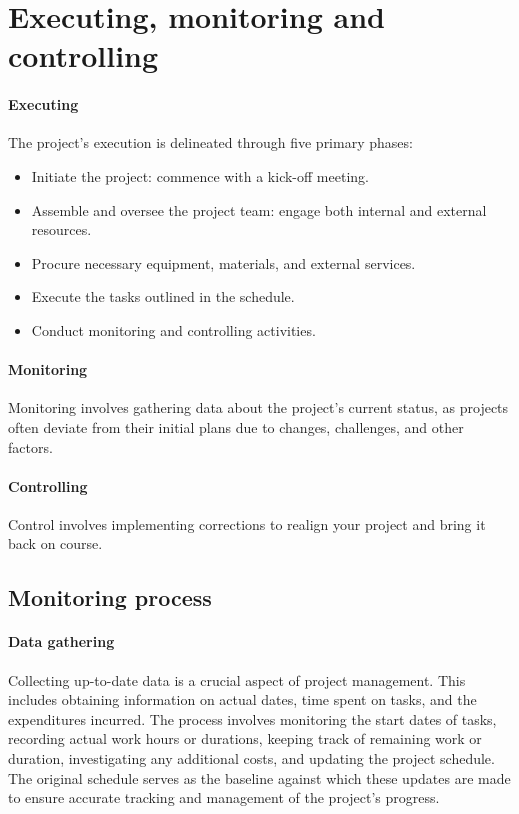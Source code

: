 \section{Executing, monitoring and controlling}

\paragraph*{Executing}
The project's execution is delineated through five primary phases:
\begin{itemize}
\item Initiate the project: commence with a kick-off meeting.
\item Assemble and oversee the project team: engage both internal and external resources.
\item Procure necessary equipment, materials, and external services.
\item Execute the tasks outlined in the schedule.
\item Conduct monitoring and controlling activities.
\end{itemize}

\paragraph*{Monitoring}
Monitoring involves gathering data about the project's current status, as projects often deviate from their initial plans due to changes, challenges, and other factors.

\paragraph*{Controlling}
Control involves implementing corrections to realign your project and bring it back on course.

\subsection{Monitoring process}
\paragraph*{Data gathering}
Collecting up-to-date data is a crucial aspect of project management. 
This includes obtaining information on actual dates, time spent on tasks, and the expenditures incurred. 
The process involves monitoring the start dates of tasks, recording actual work hours or durations, keeping track of remaining work or duration, investigating any additional costs, and updating the project schedule. 
The original schedule serves as the baseline against which these updates are made to ensure accurate tracking and management of the project's progress.

